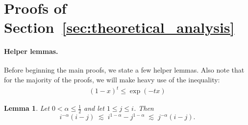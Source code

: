 \documentclass{article}
\newtheorem{lemma}{Lemma}
\theoremstyle{plain}
\begin{document}



\newpage
\appendix
\onecolumn

\section{Proofs of Section~\ref{sec:theoretical_analysis}}
\label{app:proofs}
\paragraph{Helper lemmas.} Before beginning the main proofs, we state a few helper lemmas. Also note that for the majority of the proofs, we will make heavy use of the inequality:
\begin{align}
    (1-x)^t \leq \exp(-tx)
\end{align}
\begin{lemma}
\label{lem:mvt_bound}
Let $0<\alpha\le \frac12$ and let $1\le j\le i$. Then
\[
i^{-\alpha}(i-j)
\;\lesssim\;
i^{1-\alpha}-j^{1-\alpha}
\;\lesssim\;
j^{-\alpha}(i-j).
\]
\end{lemma}
\end{document}
